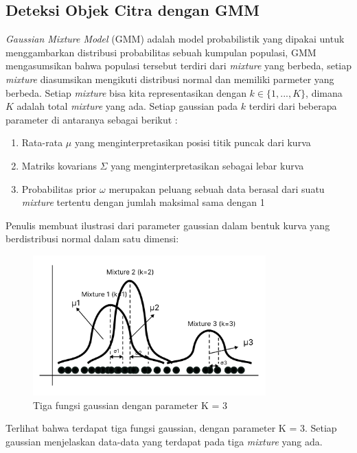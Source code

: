 \subsection{Deteksi Objek Citra dengan GMM}

\emph{Gaussian Mixture Model} (GMM) adalah model probabilistik yang dipakai untuk
menggambarkan distribusi probabilitas sebuah kumpulan populasi, GMM mengasumsikan 
bahwa populasi tersebut terdiri dari \emph{mixture} yang berbeda, setiap \emph{mixture} 
diasumsikan mengikuti distribusi normal dan memiliki parmeter yang berbeda. 
Setiap \emph{mixture} bisa kita representasikan dengan \(k \in \{1, ..., K\}\), 
dimana \(K\) adalah total \emph{mixture} yang ada. Setiap gaussian pada \(k\) terdiri dari 
beberapa parameter di antaranya sebagai berikut :

\begin{enumerate}
	\item Rata-rata \(\mu\) yang menginterpretasikan posisi titik puncak dari kurva
	\item Matriks kovarians \(\Sigma\) yang menginterpretasikan sebagai lebar kurva
	\item Probabilitas prior \(\omega\) merupakan peluang sebuah data berasal dari 
		  suatu \emph{mixture} tertentu dengan jumlah maksimal sama dengan 1
\end{enumerate}

Penulis membuat ilustrasi dari parameter gaussian dalam bentuk kurva yang berdistribusi 
normal dalam satu dimensi:

\begin{figure}[H]
	\centering{}
	\includegraphics[width=0.8\textwidth]{gambar/gmm_curve.png}
	\caption{Tiga fungsi gaussian dengan parameter K = 3}
\end{figure}

Terlihat bahwa terdapat tiga fungsi gaussian, dengan parameter K = 3. Setiap gaussian
menjelaskan data-data yang terdapat pada tiga \emph{mixture} yang ada. 

